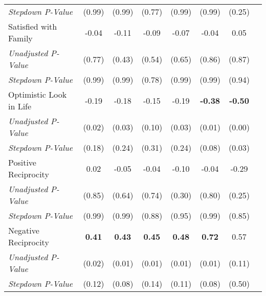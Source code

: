 \begin{tabular}{l c c c c c c c}
\quad \textit{Stepdown P-Value} & (0.99) & (0.99) & (0.77) & (0.99) & (0.99) & (0.25) \\
Satisfied with Family & -0.04 & -0.11 & -0.09 & -0.07 & -0.04 & 0.05 \\
\quad \textit{Unadjusted P-Value} & (0.77) & (0.43) & (0.54) & (0.65) & (0.86) & (0.87) \\
\quad \textit{Stepdown P-Value} & (0.99) & (0.99) & (0.78) & (0.99) & (0.99) & (0.94) \\
Optimistic Look in Life & -0.19 & -0.18 & -0.15 & -0.19 & \textbf{ -0.38 } & \textbf{ -0.50 } \\
\quad \textit{Unadjusted P-Value} & (0.02) & (0.03) & (0.10) & (0.03) & (0.01) & (0.00) \\
\quad \textit{Stepdown P-Value} & (0.18) & (0.24) & (0.31) & (0.24) & (0.08) & (0.03) \\
Positive Reciprocity & 0.02 & -0.05 & -0.04 & -0.10 & -0.04 & -0.29 \\
\quad \textit{Unadjusted P-Value} & (0.85) & (0.64) & (0.74) & (0.30) & (0.80) & (0.25) \\
\quad \textit{Stepdown P-Value} & (0.99) & (0.99) & (0.88) & (0.95) & (0.99) & (0.85) \\
Negative Reciprocity & \textbf{ 0.41 } & \textbf{ 0.43 } & \textbf{ 0.45 } & \textbf{ 0.48 } & \textbf{ 0.72 } & 0.57 \\
\quad \textit{Unadjusted P-Value} & (0.02) & (0.01) & (0.01) & (0.01) & (0.01) & (0.11) \\
\quad \textit{Stepdown P-Value} & (0.12) & (0.08) & (0.14) & (0.11) & (0.08) & (0.50) \\
\bottomrule
\end{tabular}
